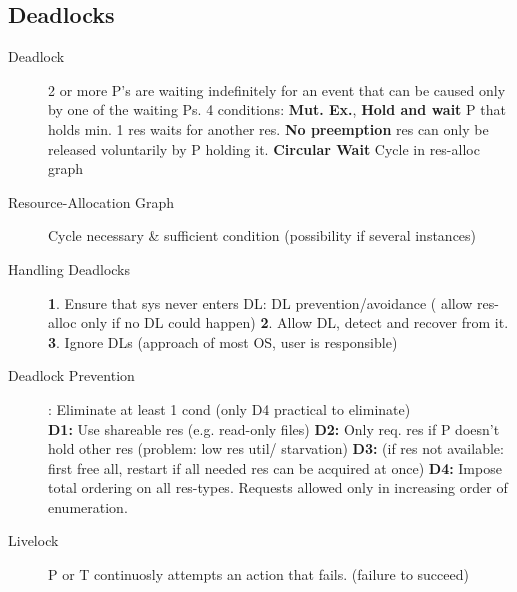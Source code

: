 \subsection*{Deadlocks}
\begin{description}
    \item[Deadlock]2 or more P's are waiting indefinitely for an event that can be caused only by one of the waiting Ps. 4 conditions: \textbf{Mut. Ex.}, \textbf{Hold and wait} P that holds min. 1 res waits for another res. \textbf{No preemption} res can only be released voluntarily by P holding it. \textbf{Circular Wait} Cycle in res-alloc graph
    \item[Resource-Allocation Graph] Cycle necessary \& sufficient condition (possibility if several instances) %
    \item[Handling Deadlocks]\textbf{1}. Ensure that sys never enters DL: DL prevention/avoidance ( allow res-alloc only if no DL could happen) \textbf{2}. Allow DL, detect and recover from it. \textbf{3}. Ignore DLs (approach of most OS, user is responsible)
    \item[Deadlock Prevention]: Eliminate at least 1 cond (only D4 practical to eliminate) \\
    \textbf{D1:} Use shareable res (e.g. read-only files) \textbf{D2:} Only req. res if P doesn’t hold other res (problem: low res util/ starvation) \textbf{D3:} (if res not available: first free all, restart if all needed res can be acquired at once) \textbf{D4:} Impose total ordering on all res-types. Requests allowed only in increasing order of enumeration.
    \item[Livelock] P or T continuosly attempts an action that fails. (failure to succeed)
\end{description}

